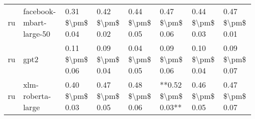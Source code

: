 \begin{tabular}{llllllll}
      ru &            facebook-mbart-large-50 & 0.31 \$\textbackslash pm\$ 0.04 &           0.42 \$\textbackslash pm\$ 0.02 &       0.44 \$\textbackslash pm\$ 0.05 &        0.47 \$\textbackslash pm\$ 0.06 &                         0.44 \$\textbackslash pm\$ 0.03 &     0.47 \$\textbackslash pm\$ 0.01 \\
      ru &                               gpt2 & 0.11 \$\textbackslash pm\$ 0.06 &           0.09 \$\textbackslash pm\$ 0.04 &       0.04 \$\textbackslash pm\$ 0.05 &        0.09 \$\textbackslash pm\$ 0.06 &                         0.10 \$\textbackslash pm\$ 0.04 &     0.09 \$\textbackslash pm\$ 0.07 \\
      ru &                  xlm-roberta-large & 0.40 \$\textbackslash pm\$ 0.03 &           0.47 \$\textbackslash pm\$ 0.05 &       0.48 \$\textbackslash pm\$ 0.06 &    **0.52 \$\textbackslash pm\$ 0.03** &                         0.46 \$\textbackslash pm\$ 0.05 &     0.47 \$\textbackslash pm\$ 0.07 \\
\bottomrule
\end{tabular}
